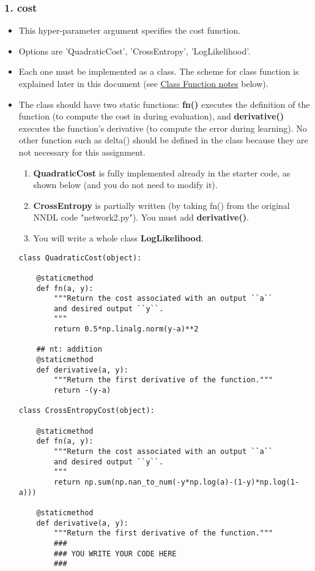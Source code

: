 \documentclass[11pt]{article}
\begin{document}
\subsubsection*{1. cost}
\label{sec:orgb44740b}
\begin{itemize}
\item This hyper-parameter argument specifies the cost function.
\item Options are 'QuadraticCost', 'CrossEntropy', 'LogLikelihood'.

\item Each one must be implemented as a class.  The scheme for class function is explained later in this document (see \hyperref[sec:org77df2bb]{Class Function notes} below).
\item The class should have two static functions: \textbf{fn()} executes the definition of the function (to compute the cost in during evaluation), and \textbf{derivative()} executes the function's derivative (to compute the error during learning).  No other function such as delta() should be defined in the class because they are not necessary for this assignment.
\begin{enumerate}
\item \textbf{QuadraticCost} is fully implemented already in the starter code, as shown below (and you do not need to modify it).
\item \textbf{CrossEntropy} is partially written (by taking fn() from the original NNDL code "network2.py").  You must add \textbf{derivative()}.
\item You will write a whole class \textbf{LogLikelihood}.
\end{enumerate}
\begin{verbatim}
class QuadraticCost(object):

    @staticmethod
    def fn(a, y):
        """Return the cost associated with an output ``a``
        and desired output ``y``.
        """
        return 0.5*np.linalg.norm(y-a)**2

    ## nt: addition
    @staticmethod
    def derivative(a, y):
        """Return the first derivative of the function."""
        return -(y-a)

class CrossEntropyCost(object):

    @staticmethod
    def fn(a, y):
        """Return the cost associated with an output ``a`` 
        and desired output ``y``.
        """
        return np.sum(np.nan_to_num(-y*np.log(a)-(1-y)*np.log(1-a)))

    @staticmethod
    def derivative(a, y):
        """Return the first derivative of the function."""
        ###
        ### YOU WRITE YOUR CODE HERE
        ###
\end{verbatim}
\end{itemize}
\end{document}
